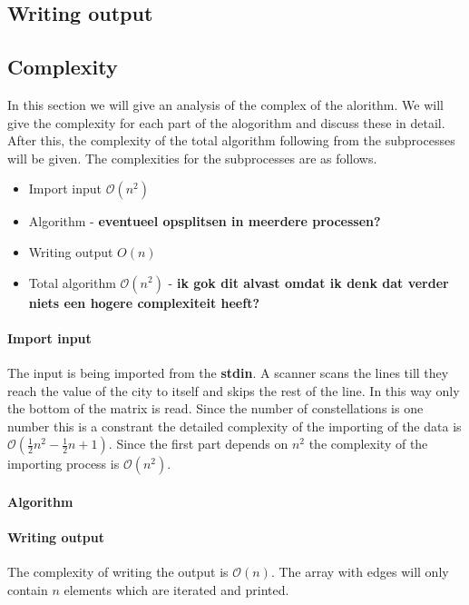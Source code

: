 \documentclass{article}
\newcommand{\bigO}[1]{\mathcal{O}(#1)}
\begin{document}
\subsection{Writing output}

\subsection{Complexity}
In this section we will give an analysis of the complex of the alorithm. We will give the complexity for each part of the alogorithm and discuss these in detail. After this, the complexity of the total algorithm following from the subprocesses will be given. The complexities for the subprocesses are as follows.
\begin{itemize}
  \item Import input $\bigO{n^2}$
  \item Algorithm - \textbf{eventueel opsplitsen in meerdere processen?}
  \item Writing output $O(n)$
  \item Total algorithm $\bigO{n^2}$ - \textbf{ik gok dit alvast omdat ik denk dat verder niets een hogere complexiteit heeft?}
\end{itemize}

\paragraph{Import input}
The input is being imported from the \textbf{stdin}. A scanner scans the lines till they reach the value of the city to itself and skips the rest of the line. In this way only the bottom of the matrix is read. Since the number of constellations is one number this is a constrant the detailed complexity of the importing of the data is $\bigO{\frac{1}{2}n^2 - \frac{1}{2}n + 1}$. Since the first part depends on $n^2$ the complexity of the importing process is $\bigO{n^2}$.

\paragraph{Algorithm}

\paragraph{Writing output}
The complexity of writing the output is $\bigO{n}$. The array with edges will only contain $n$ elements which are iterated and printed.
\end{document}

